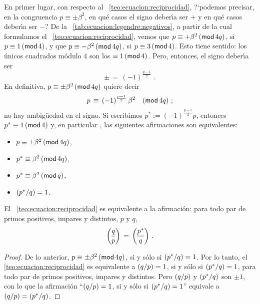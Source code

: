 En primer lugar, con respecto al \teoname~\ref{teo:ecuacion:reciprocidad},
?`podemos precisar, en la congruencia $p\equiv\pm\beta^2$, en qu\'e casos
el signo deber\'{\i}a ser $+$ y en qu\'e casos deber\'{\i}a ser $-$?
De la \tablename~\ref{tab:ecuacion:legendre:negativos}, a partir de la
cual formulamos el \teoname~\ref{teo:ecuacion:reciprocidad}, vemos que
$p\equiv+\beta^2\tmodulo[4q]$, si $p\equiv 1\tmodulo[4]$, y que
$p\equiv-\beta^2\tmodulo[4q]$, si $p\equiv 3\tmodulo[4]$. Esto tiene
sentido: los \'unicos cuadrados m\'odulo $4$ son los $\equiv 1\tmodulo[4]$.
Pero, entonces, el signo deber\'{\i}a ser
\begin{displaymath}
	\pm\,=\,(-1)^{\frac{p-1} 2}
	\text{ .}
\end{displaymath}
%
En definitiva, $p\equiv\pm\beta^2\tmodulo[4q]$ quiere decir
\begin{displaymath}
	p\,\equiv\,(-1)^{\frac{p-1} 2}\,\beta^2\modulo[4q]
	\text{ ;}
\end{displaymath}
%
no hay ambig\"uedad en el signo. Si escribimos $p^*:=(-1)^{\frac{p-1} 2}p$,
entonces $p^*\equiv 1\tmodulo[4]$ y, en particular \quedacomoejercicio,
las siguientes afirmaciones son equivalentes:
\begin{itemize}
	\item $p\equiv\pm\beta^2\tmodulo[4q]$,
	\item $p^*\equiv\beta^2\tmodulo[4q]$,
	\item $p^*\equiv\beta^2\tmodulo[q]$,
	\item $\tlegendre{p^*} q=1$.
\end{itemize}
%

\begin{lemaEcuacion}\label{lema:ecuacion:reciprocidad}
	El \teoname~\ref{teo:ecuacion:reciprocidad} es equivalente a la
	afirmaci\'on: para todo par de primos positivos, impares y distintos,
	$p$ y $q$,
	\begin{displaymath}
		\legendre q{p}\,=\,\legendre{p^*} q
		\text{ .}
	\end{displaymath}
\end{lemaEcuacion}

\begin{proof}
	De lo anterior, $p\equiv\pm\beta^2\tmodulo[4q]$, si y s\'olo si
	$\tlegendre{p^*} q=1$. Por lo tanto, el \teoname~%
	\ref{teo:ecuacion:reciprocidad} es equivalente a
	$\tlegendre q{p}=1$, si y s\'olo si $\tlegendre{p^*} q=1$,
	para todo par de primos positivos, impares y distintos.
	Pero $\tlegendre q{p}$ y $\tlegendre{p^*} q$ son $\pm1$, con lo que
	la afirmaci\'on
	``$\tlegendre q{p}=1$, si y s\'olo si $\tlegendre{p^*} q=1$''
	equivale a $\tlegendre q{p}=\tlegendre{p^*} q$.
\end{proof}

